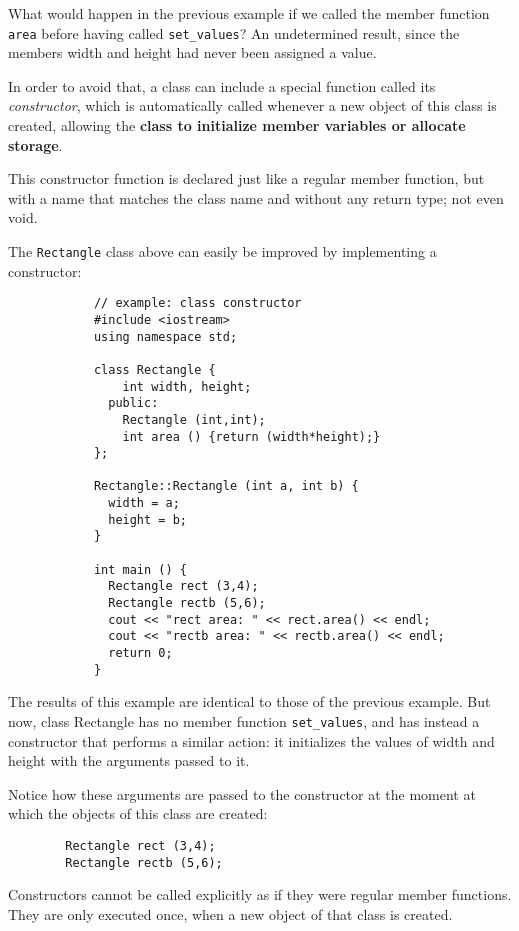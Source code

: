 		What would happen in the previous example if we called the member function \verb|area| before having called \verb|set_values|? An undetermined result, since the members width and height had never been assigned a value.

		In order to avoid that, a class can include a special function called its \textit{constructor}, which is automatically called whenever a new object of this class is created, allowing the \textbf{class to initialize member variables or allocate storage}.

		This constructor function is declared just like a regular member function, but with a name that matches the class name and without any return type; not even void.


		The \verb|Rectangle| class above can easily be improved by implementing a constructor:

		\begin{verbatim}
			// example: class constructor
			#include <iostream>
			using namespace std;

			class Rectangle {
			    int width, height;
			  public:
			    Rectangle (int,int);
			    int area () {return (width*height);}
			};

			Rectangle::Rectangle (int a, int b) {
			  width = a;
			  height = b;
			}

			int main () {
			  Rectangle rect (3,4);
			  Rectangle rectb (5,6);
			  cout << "rect area: " << rect.area() << endl;
			  cout << "rectb area: " << rectb.area() << endl;
			  return 0;
			}

		\end{verbatim}

		The results of this example are identical to those of the previous example. But now, class Rectangle has no member function \verb|set_values|, and has instead a constructor that performs a similar action: it initializes the values of width and height with the arguments passed to it.


		Notice how these arguments are passed to the constructor at the moment at which the objects of this class are created:

		\begin{verbatim}
		Rectangle rect (3,4);
		Rectangle rectb (5,6);
		\end{verbatim}


		Constructors cannot be called explicitly as if they were regular member functions. They are only executed once, when a new object of that class is created.

